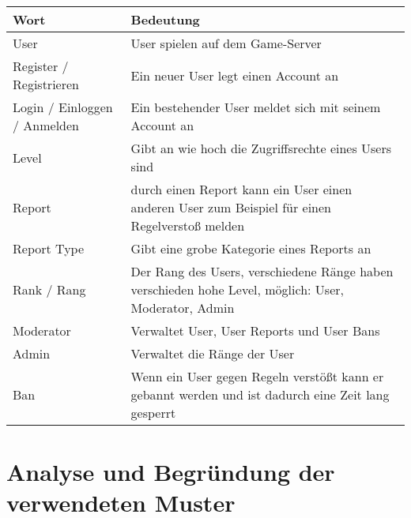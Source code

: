 \begin{center}
    \begin{tabular}{ | l | m{8cm} | }
        \hline
        Wort                         & Bedeutung                                                                                            \\ \hline
        User                         & User spielen auf dem Game-Server                                                                     \\ \hline
        Register / Registrieren      & Ein neuer User legt einen Account an                                                                 \\ \hline
        Login / Einloggen / Anmelden & Ein bestehender User meldet sich mit seinem Account an                                               \\ \hline
        Level                        & Gibt an wie hoch die Zugriffsrechte eines Users sind                                                 \\ \hline
        Report                       & durch einen Report kann ein User einen anderen User zum Beispiel für einen Regelverstoß melden       \\ \hline
        Report Type                  & Gibt eine grobe Kategorie eines Reports an                                                           \\ \hline
        Rank / Rang                  & Der Rang des Users, verschiedene Ränge haben verschieden hohe Level, möglich: User, Moderator, Admin \\ \hline
        Moderator                    & Verwaltet User, User Reports und User Bans                                                           \\ \hline
        Admin                        & Verwaltet die Ränge der User                                                                         \\ \hline
        Ban                          & Wenn ein User gegen Regeln verstößt kann er gebannt werden und ist dadurch eine Zeit lang gesperrt   \\ \hline
    \end{tabular}
\end{center}


\section{Analyse und Begründung der verwendeten Muster}

